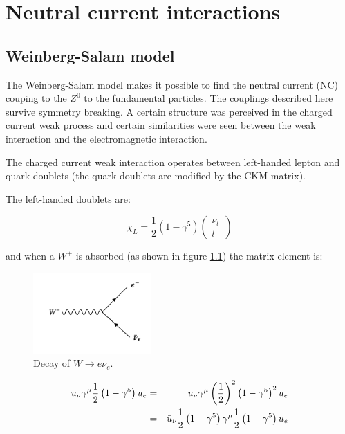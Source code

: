 \chapter{Neutral current interactions}

\section{Weinberg-Salam model}

The Weinberg-Salam model makes it possible to find the neutral current (NC) couping to the $Z^0$ to the fundamental particles.  The couplings described here survive symmetry breaking.  A certain structure was perceived in the charged current weak process and certain similarities were seen between the weak interaction and the electromagnetic interaction.

The charged current weak interaction operates between left-handed lepton and quark doublets (the quark doublets are modified by the CKM matrix).

The left-handed doublets are:

\[
  \chi_L = \frac{1}{2}\left(1 - \gamma^5\right)
  \left(
  \begin{array}{c}
    \nu_l \\
    l^-
  \end{array}
  \right)
\]

and when a $W^+$ is absorbed (as shown in figure \ref{fig:ch13_WENu}) the matrix element is:

\begin{figure}[!htb]
  \begin{center}
    \includegraphics[width=0.4\textwidth]{images/web_feynman/image_56.png}
    \caption[Decay of $W\to e\nu_e$]{Decay of $W\to e\nu_e$.}
    \label{fig:ch13_WENu}
  \end{center}
\end{figure}

\begin{eqnarray*}
  \bar{u}_{\nu}\gamma^{\mu}\frac{1}{2}\left(1 - \gamma^5\right)u_{e} & = & \bar{u}_{\nu}\gamma^{\mu}\left(\frac{1}{2}\right)^2\left(1 - \gamma^5\right)^2u_{e} \\
  & = & \bar{u}_{\nu}\frac{1}{2}\left(1 + \gamma^5\right)\gamma^{\mu}\frac{1}{2}\left(1 - \gamma^5\right)u_{e}
\end{eqnarray*}

